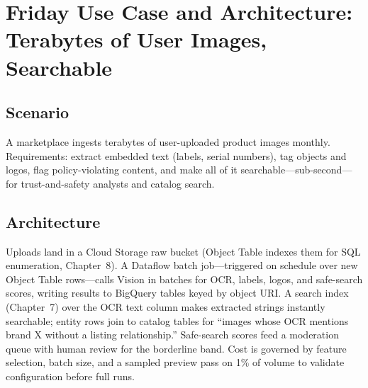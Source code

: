 \section{Friday Use Case and Architecture: Terabytes of User Images, Searchable}

\subsection{Scenario}
A marketplace ingests terabytes of user-uploaded product images monthly. Requirements: extract embedded text (labels, serial numbers), tag objects and logos, flag policy-violating content, and make all of it searchable---sub-second---for trust-and-safety analysts and catalog search.

\subsection{Architecture}
Uploads land in a Cloud Storage raw bucket (Object Table indexes them for SQL enumeration, Chapter~8). A Dataflow batch job---triggered on schedule over new Object Table rows---calls Vision in batches for OCR, labels, logos, and safe-search scores, writing results to BigQuery tables keyed by object URI. A search index (Chapter~7) over the OCR text column makes extracted strings instantly searchable; entity rows join to catalog tables for ``images whose OCR mentions brand X without a listing relationship.'' Safe-search scores feed a moderation queue with human review for the borderline band. Cost is governed by feature selection, batch size, and a sampled preview pass on 1\% of volume to validate configuration before full runs.

